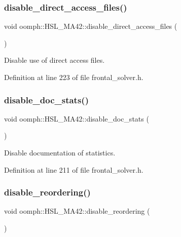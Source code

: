 \subsubsection{\texorpdfstring{disable\+\_\+direct\+\_\+access\+\_\+files()}{disable\_direct\_access\_files()}}
{\footnotesize\ttfamily void oomph\+::\+H\+S\+L\+\_\+\+M\+A42\+::disable\+\_\+direct\+\_\+access\+\_\+files (\begin{DoxyParamCaption}{ }\end{DoxyParamCaption})\hspace{0.3cm}{\ttfamily [inline]}}



Disable use of direct access files. 



Definition at line 223 of file frontal\+\_\+solver.\+h.

\mbox{\label{classoomph_1_1HSL__MA42_aeb9ed583870a140508c8eb77ceecf3b2}} 
\subsubsection{\texorpdfstring{disable\+\_\+doc\+\_\+stats()}{disable\_doc\_stats()}}
{\footnotesize\ttfamily void oomph\+::\+H\+S\+L\+\_\+\+M\+A42\+::disable\+\_\+doc\+\_\+stats (\begin{DoxyParamCaption}{ }\end{DoxyParamCaption})\hspace{0.3cm}{\ttfamily [inline]}}



Disable documentation of statistics. 



Definition at line 211 of file frontal\+\_\+solver.\+h.

\mbox{\label{classoomph_1_1HSL__MA42_a9fa85bebbf456888d454ffb8b8783089}} 
\subsubsection{\texorpdfstring{disable\+\_\+reordering()}{disable\_reordering()}}
{\footnotesize\ttfamily void oomph\+::\+H\+S\+L\+\_\+\+M\+A42\+::disable\+\_\+reordering (\begin{DoxyParamCaption}{ }\end{DoxyParamCaption})\hspace{0.3cm}{\ttfamily [inline]}}



